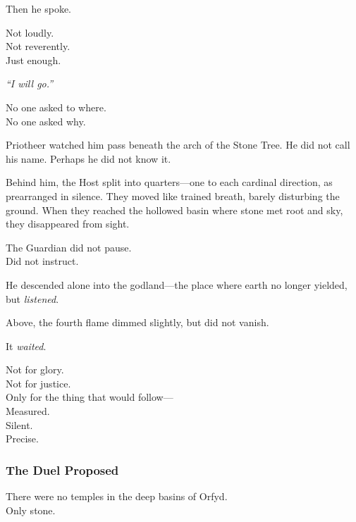 \documentclass[12pt]{article}
\begin{document}
\vspace{0.5em}
Then he spoke.

\vspace{0.5em}
Not loudly.\\
Not reverently.\\
Just enough.

\vspace{0.5em}
\textit{``I will go.''}

\vspace{0.5em}
No one asked to where.\\
No one asked why.

\vspace{0.5em}
Priotheer watched him pass beneath the arch of the Stone Tree. He did not call his name. Perhaps he did not know it.

\vspace{0.5em}
Behind him, the Host split into quarters---one to each cardinal direction, as prearranged in silence. They moved like trained breath, barely disturbing the ground. When they reached the hollowed basin where stone met root and sky, they disappeared from sight.

\vspace{0.5em}
The Guardian did not pause.\\
Did not instruct.

\vspace{0.5em}
He descended alone into the godland---the place where earth no longer yielded, but \textit{listened}.

\vspace{0.5em}
Above, the fourth flame dimmed slightly, but did not vanish.

\vspace{0.5em}
It \textit{waited}.

\vspace{0.5em}
Not for glory.\\
Not for justice.\\
Only for the thing that would follow---\\
Measured.\\
Silent.\\
Precise.


\dotfill

\subsubsection*{The Duel Proposed}

There were no temples in the deep basins of Orfyd.\\
Only stone.
\end{document}
